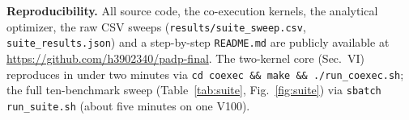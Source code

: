 \documentclass[conference]{IEEEtran}
\begin{document}
\medskip
\noindent\textbf{Reproducibility.} All source code, the co-execution kernels, the
analytical optimizer, the raw CSV sweeps (\texttt{results/suite\_sweep.csv},
\texttt{suite\_results.json}) and a step-by-step \texttt{README.md} are publicly available
at \url{https://github.com/h3902340/padp-final}. The two-kernel core (Sec.~VI) reproduces
in under two minutes via \texttt{cd coexec \&\& make \&\& ./run\_coexec.sh}; the full
ten-benchmark sweep (Table~\ref{tab:suite}, Fig.~\ref{fig:suite}) via
\texttt{sbatch run\_suite.sh} (about five minutes on one V100).
\end{document}
